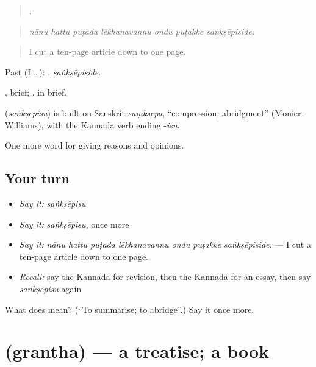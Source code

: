 \begin{quote}
      .
\end{quote}

\begin{quote}
\emph{nānu hattu puṭada lēkhanavannu ondu puṭakke saṅkṣēpiside.}
\end{quote}

\begin{quote}
I cut a ten-page article down to one page.
\end{quote}

Past (I …): , \emph{saṅkṣēpiside}.

, brief; , in brief.

\begin{cousinweb}
\textbf{} (\emph{saṅkṣēpisu}) is built on Sanskrit \emph{saṃkṣepa}, \textquotedblleft{}compression, abridgment\textquotedblright{} (Monier-Williams), with the Kannada verb ending -\emph{isu}.
\end{cousinweb}

\begin{grammarlens}[title={What you've built}]
One more word for giving reasons and opinions.
\end{grammarlens}

\subsection*{Your turn}
\begin{itemize}
\raggedright
  \item \emph{Say it:} \emph{saṅkṣēpisu}
  \item \emph{Say it:} \emph{saṅkṣēpisu}, once more
  \item \emph{Say it:} \emph{nānu hattu puṭada lēkhanavannu ondu puṭakke saṅkṣēpiside.} — I cut a ten-page article down to one page.
  \item \emph{Recall:} say the Kannada for revision, then the Kannada for an essay, then say \emph{saṅkṣēpisu} again
\end{itemize}

\begin{tcolorbox}[breakable,colback=teal!4,colframe=teal!35!black,title={Before you move on}]
What does  mean? (\textquotedblleft{}To summarise; to abridge\textquotedblright{}.) Say it once more.
\end{tcolorbox}
\section[\texorpdfstring{\kn{ಗ್ರಂಥ} (grantha)}{ಗ್ರಂಥ (grantha)}]{ (grantha) — a treatise; a book}

